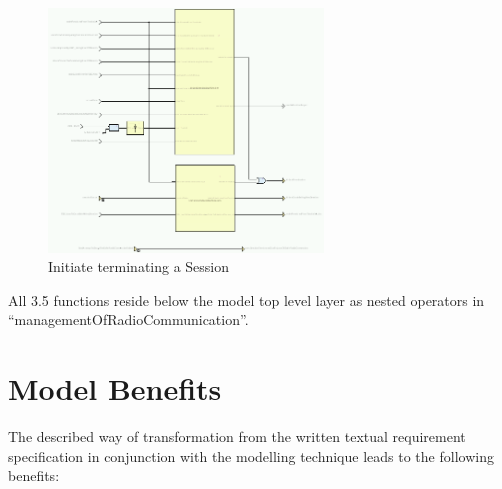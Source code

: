 \documentclass{template/openetcs_article}
\begin{document}
\begin{figure}[htbp]
	\centering
		\includegraphics[width=0.65\textwidth]{InitiateTermination.png}
	\caption{Initiate terminating a Session}
	\label{fig:InitiateTermination}
\end{figure}

All 3.5 functions reside below the model top level layer as nested operators in "`managementOfRadioCommunication"'.
 
\clearpage

\section{Model Benefits}
\label{sec:model-highlights}

The described way of transformation from the written textual requirement specification in conjunction with the modelling technique leads to the following benefits:
\end{document}

